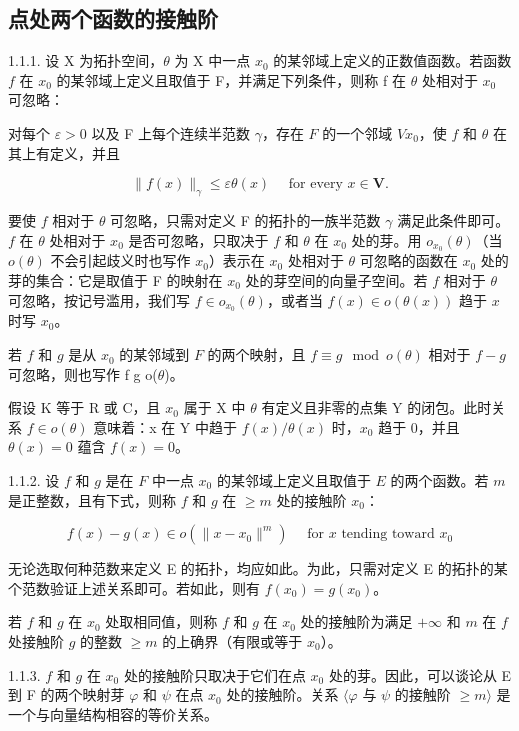 \subsection{点处两个函数的接触阶}

1.1.1. 设 X 为拓扑空间，\(\theta\) 为 X 中一点 \(x_0\) 的某邻域上定义的正数值函数。若函数 \(f\) 在 \(x_0\) 的某邻域上定义且取值于 F，并满足下列条件，则称 f 在 \(\theta\) 处相对于 \(x_0\) 可忽略：

对每个 \(\varepsilon > 0\) 以及 F 上每个连续半范数 \(\gamma\)，存在 \(F\) 的一个邻域 \(V\)\(x_0\)，使 \(f\) 和 \(\theta\) 在其上有定义，并且

\[
\| f (x) \| _ {\gamma} \leqslant \varepsilon \theta (x) \quad \text { for   every } x \in \mathbf {V}.
\]

要使 \(f\) 相对于 \(\theta\) 可忽略，只需对定义 F 的拓扑的一族半范数 \(\gamma\) 满足此条件即可。\(f\) 在 \(\theta\) 处相对于 \(x_{0}\) 是否可忽略，只取决于 \(f\) 和 \(\theta\) 在 \(x_{0}\) 处的芽。用 \(o_{x_{0}}(\theta)\)（当 \(o(\theta)\) 不会引起歧义时也写作 \(x_{0}\)）表示在 \(x_{0}\) 处相对于 \(\theta\) 可忽略的函数在 \(x_{0}\) 处的芽的集合：它是取值于 F 的映射在 \(x_{0}\) 处的芽空间的向量子空间。若 \(f\) 相对于 \(\theta\) 可忽略，按记号滥用，我们写 \(f \in o_{x_{0}}(\theta)\)，或者当 \(f(x) \in o(\theta(x))\) 趋于 \(x\) 时写 \(x_{0}\)。

若 \(f\) 和 \(g\) 是从 \(x_{0}\) 的某邻域到 \(F\) 的两个映射，且 \(f \equiv g \mod o(\theta)\) 相对于 \(f - g\) 可忽略，则也写作 f  g  o(\(\theta\))。

假设 K 等于 R 或 C，且 \(x_{0}\) 属于 X 中 \(\theta\) 有定义且非零的点集 Y 的闭包。此时关系 \(f \in o(\theta)\) 意味着：x 在 Y 中趋于 \(f(x)/\theta(x)\) 时，\(x_{0}\) 趋于 0，并且 \(\theta(x) = 0\) 蕴含 \(f(x) = 0\)。

1.1.2. 设 \(f\) 和 \(g\) 是在 \(F\) 中一点 \(x_0\) 的某邻域上定义且取值于 \(E\) 的两个函数。若 \(m\) 是正整数，且有下式，则称 \(f\) 和 \(g\) 在 \(\geqslant m\) 处的接触阶 \(x_0\)：

\[
f (x) - g (x) \in o (\| x - x _ {0} \| ^ {m}) \quad \text { for } x \text { tending   toward } x _ {0}
\]

无论选取何种范数来定义 E 的拓扑，均应如此。为此，只需对定义 E 的拓扑的某个范数验证上述关系即可。若如此，则有 \(f(x_0) = g(x_0)\)。

若 \(f\) 和 \(g\) 在 \(x_{0}\) 处取相同值，则称 \(f\) 和 \(g\) 在 \(x_{0}\) 处的接触阶为满足 \(+\infty\) 和 \(m\) 在 \(f\) 处接触阶 \(g\) 的整数 \(\geqslant m\) 的上确界（有限或等于 \(x_{0}\)）。

1.1.3. \(f\) 和 \(g\) 在 \(x_{0}\) 处的接触阶只取决于它们在点 \(x_{0}\) 处的芽。因此，可以谈论从 E 到 F 的两个映射芽 \(\varphi\) 和 \(\psi\) 在点 \(x_{0}\) 处的接触阶。关系 \(\langle\varphi\) 与 \(\psi\) 的接触阶 \(\geqslant m\rangle\) 是一个与向量结构相容的等价关系。

